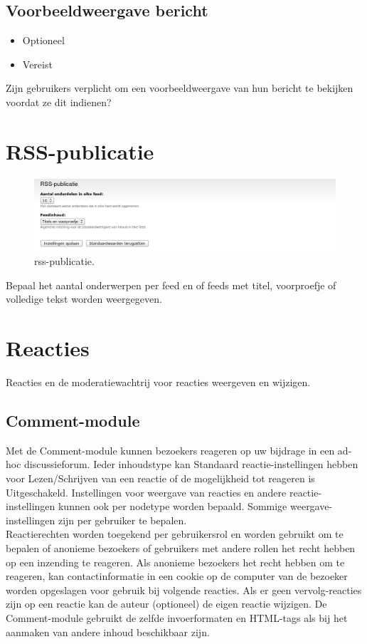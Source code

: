 \subsection{Voorbeeldweergave bericht}
\begin{itemize}
\item Optioneel
\item Vereist
\end{itemize}
Zijn gebruikers verplicht om een voorbeeldweergave van hun bericht te bekijken
voordat ze dit indienen?

\section{RSS-publicatie} 
\begin{figure}[!h]
    \centering
   \includegraphics[scale=0.3,angle=0]{rss-publicatie}
   \caption{rss-publicatie.\label{white}}
 \end{figure}
Bepaal het aantal onderwerpen per feed en of feeds met titel, voorproefje of
volledige tekst worden weergegeven.

\section{Reacties} 
Reacties en de moderatiewachtrij voor reacties weergeven en wijzigen.
\subsection{Comment-module} 
Met de Comment-module kunnen bezoekers reageren op uw bijdrage in een ad-hoc discussieforum.
Ieder inhoudstype kan Standaard reactie-instellingen hebben voor Lezen/Schrijven van een reactie
of de mogelijkheid tot reageren is Uitgeschakeld. Instellingen voor weergave van reacties en andere
reactie-instellingen kunnen ook per nodetype worden bepaald. Sommige weergave-instellingen zijn per gebruiker te bepalen.
\\
Reactierechten  worden toegekend per gebruikersrol en
worden gebruikt om te bepalen of anonieme bezoekers of gebruikers met andere rollen het recht hebben op een inzending te reageren. Als anonieme bezoekers het
recht hebben om te reageren, kan contactinformatie in een cookie op de computer van de bezoeker worden
opgeslagen voor gebruik bij volgende reacties. Als er geen vervolg-reacties zijn op een reactie kan de
auteur (optioneel) de eigen reactie wijzigen. De Comment-module gebruikt de zelfde invoerformaten en
HTML-tags als bij het aanmaken van andere inhoud beschikbaar zijn.
